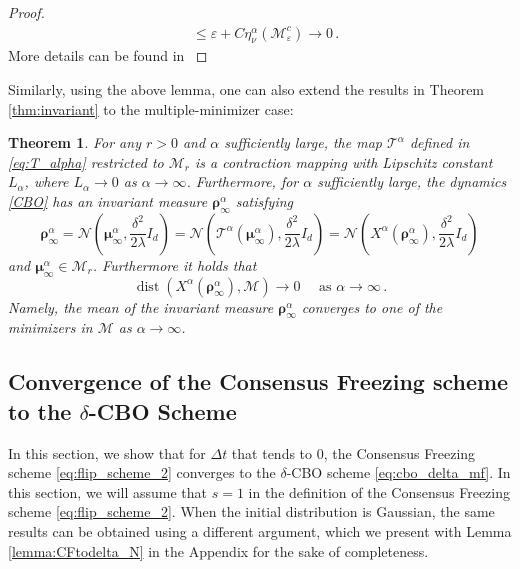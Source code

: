\documentclass[reqno]{amsart}
\numberwithin{algorithm}{section}
\newcommand{\Xalpha}{{X^\alpha}}
\newcommand{\mc}[1]{\mathcal{#1}}
\newtheorem{theorem}{Theorem}[section]
\begin{document}
{\begin{proof}
\begin{align*}
  &\leq \varepsilon+ C\eta_\nu^\alpha(\mathcal{M}_\varepsilon^c)\to 0\,.
\end{align*}
More details can be found in \cite[Theorem 4.9]{huang2025faithful}
\end{proof}
Similarly, using the above lemma, one can also extend the results in Theorem \ref{thm:invariant} to the multiple-minimizer case:
\begin{theorem}\label{thm:invariant'}
    For any $r>0$ and 
    $\alpha$ sufficiently large,
    the map $\mc{T}^\alpha$ defined in \cref{eq:T_alpha} restricted to $\mc{M}_r$ is a contraction mapping with Lipschitz constant $L_\alpha$, where $L_\alpha\to 0$ as $\alpha\to\infty$.
    Furthermore, for $\alpha$ sufficiently large, the dynamics \eqref{CBO} has an invariant measure $\boldsymbol\rho_\infty^\alpha$ satisfying
    \begin{equation}\label{eq:invariant'}
        \boldsymbol\rho_\infty^\alpha=\mc{N}\left(\boldsymbol\mu_\infty^\alpha,\frac{\delta^2}{2\lambda}I_d\right)=\mc{N}\left(\mc{T}^\alpha(\boldsymbol\mu_\infty^\alpha),\frac{\delta^2}{2\lambda}I_d\right)=\mc{N}\left(\Xalpha(\boldsymbol\rho_\infty^\alpha),\frac{\delta^2}{2\lambda}I_d\right)
    \end{equation}
    and $\boldsymbol\mu_\infty^\alpha \in \mc{M}_r$. Furthermore it holds that
 \begin{equation}
     \operatorname{dist}(\Xalpha(\boldsymbol\rho_\infty^\alpha),\mc{M})\to 0\quad \mbox{ as }\alpha\to\infty \,.
 \end{equation}
 Namely, the mean of the invariant measure $\boldsymbol\rho_\infty^\alpha$ converges to one of the minimizers in $\mc{M}$ as $\alpha \to\infty$.
\end{theorem}



\subsection{Convergence of the Consensus Freezing scheme to the $\delta$-CBO Scheme}
In this section, we show that for $\Delta t$ that tends to $0$, the Consensus Freezing scheme \eqref{eq:flip_scheme_2} converges to the $\delta$-CBO scheme \eqref{eq:cbo_delta_mf}.
In this section, we will assume that $s=1$ in the definition of the Consensus Freezing scheme \eqref{eq:flip_scheme_2}.
When the initial distribution is Gaussian, the same results can be obtained using a different argument, which we present with Lemma \ref{lemma:CFtodelta_N} in the Appendix for the sake of completeness.

}
\end{document}
